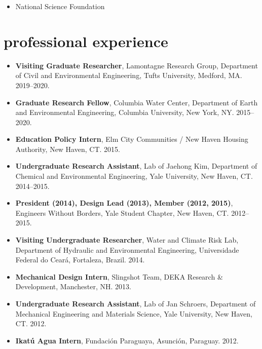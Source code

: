 \documentclass[10pt,oneside]{article}
\begin{document}


\mbox{}\vspace{-\dimexpr\baselineskip\relax}

\begin{itemize}[label={}]

  \item National Science Foundation

\end{itemize}


\section{professional experience}

\mbox{}\vspace{-\dimexpr\baselineskip\relax}

\begin{itemize}[label={}]

  \item \textbf{Visiting Graduate Researcher}, Lamontagne Research Group, Department of Civil and Environmental Engineering, Tufts University, Medford, MA. 2019--2020.

  \item \textbf{Graduate Research Fellow}, Columbia Water Center, Department of Earth and Environmental Engineering, Columbia University, New York, NY. 2015--2020.

  \item \textbf{Education Policy Intern}, Elm City Communities / New Haven Housing Authority, New Haven, CT. 2015.

  \item \textbf{Undergraduate Research Assistant}, Lab of Jaehong Kim, Department of Chemical and Environmental Engineering, Yale University, New Haven, CT. 2014--2015.

  \item \textbf{President (2014), Design Lead (2013), Member (2012, 2015)}, Engineers Without Borders, Yale Student Chapter, New Haven, CT. 2012--2015.

  \item \textbf{Visiting Undergraduate Researcher}, Water and Climate Risk Lab, Department of Hydraulic and Environmental Engineering, Universidade Federal do Ceará, Fortaleza, Brazil. 2014.

  \item \textbf{Mechanical Design Intern}, Slingshot Team, DEKA Research \& Development, Manchester, NH. 2013.

  \item \textbf{Undergraduate Research Assistant}, Lab of Jan Schroers, Department of Mechanical Engineering and Materials Science, Yale University, New Haven, CT. 2012.

  \item \textbf{Ikatú Agua Intern}, Fundación Paraguaya, Asunción, Paraguay. 2012.

\end{itemize}
\end{document}
